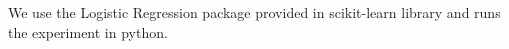 We use the Logistic Regression package provided in scikit-learn library and runs
the experiment in python. 


